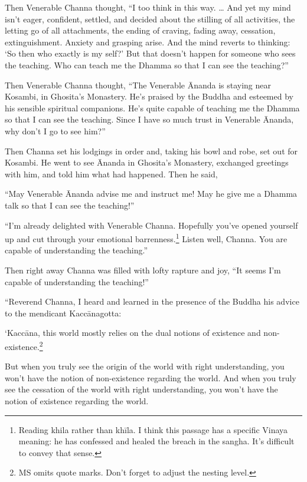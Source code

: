 \documentclass[12pt,openany]{book}%
\begin{document}
Then Venerable Channa thought, “I too think in this way. … And yet my mind isn’t eager, confident, settled, and decided about the stilling of all activities, the letting go of all attachments, the ending of craving, fading away, cessation, extinguishment. Anxiety and grasping arise. And the mind reverts to thinking: ‘So then who exactly is my self?’ But that doesn’t happen for someone who sees the teaching. Who can teach me the Dhamma so that I can see the teaching?” 

Then Venerable Channa thought, “The Venerable Ānanda is staying near Kosambi, in Ghosita’s Monastery. He’s praised by the Buddha and esteemed by his sensible spiritual companions. He’s quite capable of teaching me the Dhamma so that I can see the teaching. Since I have so much trust in Venerable Ānanda, why don’t I go to see him?” 

Then Channa set his lodgings in order and, taking his bowl and robe, set out for Kosambi. He went to see Ānanda in Ghosita’s Monastery, exchanged greetings with him, and told him what had happened. Then he said, 

“May Venerable Ānanda advise me and instruct me! May he give me a Dhamma talk so that I can see the teaching!” 

“I’m already delighted with Venerable Channa. Hopefully you’ve opened yourself up and cut through your emotional barrenness.\footnote{Reading khila rather than \textsanskrit{khīla}. I think this passage has a specific Vinaya meaning: he has confessed and healed the breach in the sangha. It’s difficult to convey that sense. } Listen well, Channa. You are capable of understanding the teaching.” 

Then right away Channa was filled with lofty rapture and joy, “It seems I’m capable of understanding the teaching!” 

“Reverend Channa, I heard and learned in the presence of the Buddha his advice to the mendicant \textsanskrit{Kaccānagotta}: 

‘\textsanskrit{Kaccāna}, this world mostly relies on the dual notions of existence and non-existence.\footnote{MS omits quote marks. Don’t forget to adjust the nesting level. } 

But when you truly see the origin of the world with right understanding, you won’t have the notion of non-existence regarding the world. And when you truly see the cessation of the world with right understanding, you won’t have the notion of existence regarding the world. 
\end{document}
